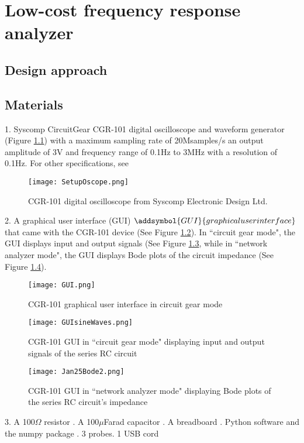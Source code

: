 \chapter{Low-cost frequency response analyzer}
	\section{Design approach}
	\section{Materials}
1. Syscomp CircuitGear CGR-101 digital oscilloscope and waveform generator (Figure \ref{Oscope}) with a maximum sampling rate of 20Msamples/s an output amplitude of 3V and frequency range of 0.1Hz to 3MHz with a resolution of 0.1Hz. For other specifications, see \cite{CircuitGearSpecs} \newline
\begin{figure}[H]
\texttt{[image: SetupOscope.png]}
\caption{CGR-101 digital oscilloscope from Syscomp Electronic Design Ltd.
\label{Oscope}}
\end{figure}
2. A graphical user interface (GUI) $\addsymbol{GUI}{graphical user interface}$ that came with the CGR-101 device \newline (See Figure \ref{GUI}). 
 In ``circuit gear mode", the GUI displays input and output signals (See Figure \ref{GUIsineWaves}, while in ``network analyzer mode", the GUI displays Bode plots of the circuit impedance (See Figure \ref{Jan25Bode2}).
%
\begin{figure}[H]
\texttt{[image: GUI.png]}
\caption{CGR-101 graphical user interface in circuit gear mode
\label{GUI}}
\end{figure}
%
\begin{figure}[H]
\texttt{[image: GUIsineWaves.png]}
\caption{CGR-101 GUI in ``circuit gear mode" displaying input and output signals of the series RC circuit
\label{GUIsineWaves}}
\end{figure}
%
\begin{figure}[H]
\texttt{[image: Jan25Bode2.png]}
\caption{CGR-101 GUI in ``network analyzer mode" displaying Bode plots of the series RC circuit's impedance
\label{Jan25Bode2}}
\end{figure}
%
3. A 100$\Omega$ resistor . A 100$\mu$Farad capacitor . A breadboard . Python software and the numpy package . 3 probes. 1 USB cord\newline
